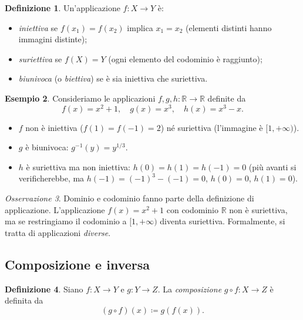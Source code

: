 \documentclass[11pt, a4paper]{book}
\theoremstyle{definition}
\newtheorem{definizione}{Definizione}[section]
\newtheorem{esempio}[definizione]{Esempio}
\theoremstyle{plain}
\theoremstyle{remark}
\newtheorem{osservazione}[definizione]{Osservazione}
\newcommand{\R}{\mathbb{R}}
\begin{document}
\begin{defbox}
\begin{definizione}
Un'applicazione $f \colon X \to Y$ è:
\begin{itemize}
  \item \emph{iniettiva} se $f(x_1) = f(x_2)$ implica $x_1 = x_2$ (elementi distinti hanno immagini distinte);
  \item \emph{suriettiva} se $f(X) = Y$ (ogni elemento del codominio è raggiunto);
  \item \emph{biunivoca} (o \emph{biettiva}) se è sia iniettiva che suriettiva.
\end{itemize}
\end{definizione}
\end{defbox}

\begin{exbox}
\begin{esempio}
Consideriamo le applicazioni $f, g, h \colon \R \to \R$ definite da
\[
  f(x) = x^2 + 1, \quad g(x) = x^3, \quad h(x) = x^3 - x.
\]
\begin{itemize}
  \item $f$ non è iniettiva ($f(1) = f(-1) = 2$) né suriettiva (l'immagine è $[1,+\infty)$).
  \item $g$ è biunivoca: $g^{-1}(y) = y^{1/3}$.
  \item $h$ è suriettiva ma non iniettiva: $h(0) = h(1) = h(-1) = 0$ (più avanti si verificherebbe, ma $h(-1)=(-1)^3 - (-1) = 0$, $h(0)=0$, $h(1)=0$).
\end{itemize}
\end{esempio}
\end{exbox}

\begin{osservazione}
Dominio e codominio fanno parte della definizione di applicazione. L'applicazione $f(x) = x^2 + 1$ con codominio $\R$ non è suriettiva, ma se restringiamo il codominio a $[1,+\infty)$ diventa suriettiva. Formalmente, si tratta di applicazioni \emph{diverse}.
\end{osservazione}

\subsection{Composizione e inversa}

\begin{defbox}
\begin{definizione}
Siano $f \colon X \to Y$ e $g \colon Y \to Z$. La \emph{composizione} $g \circ f \colon X \to Z$ è definita da
\[
  (g \circ f)(x) \coloneqq g(f(x)).
\]
\end{definizione}
\end{defbox}
\end{document}
